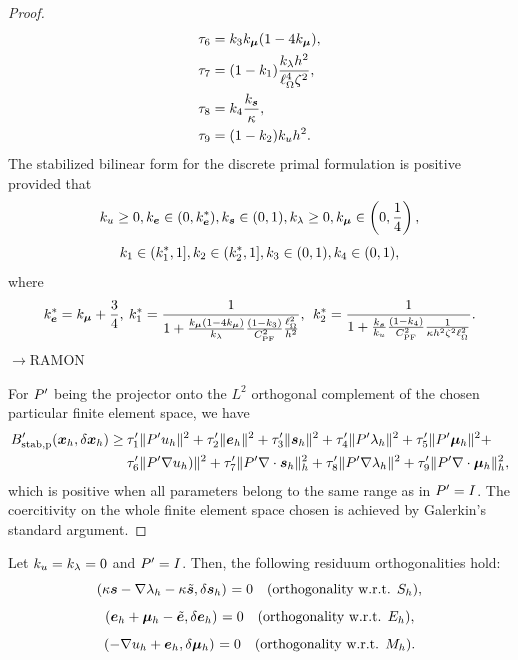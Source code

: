 \begin{proof}
\begin{align*}
    \ttdu &= \kPu\km(1-4\km),\\
    \ttds &= (1-\kYus)\frac{\kl h^2}{\length^4\zeta^2},\\
    \ttdl &= \kPl\frac{\ks}{\kappa},\\
    \ttdm &= (1-\kYlm)\ku h^2.\\
\end{align*}
The stabilized bilinear form for the discrete primal formulation is positive provided that
$$
\ku \geq 0, \ke\in(0,\ke^*),\ks\in(0, 1),\kl\geq 0,\km\in\left(0,\frac14\right),
$$
$$
\kYus\in(\kYus^*,1],\kYlm\in(\kYlm^*,1],\kPu\in(0,1),\kPl\in(0,1),
$$
where
$$
\ke^* = \km+\frac34,
\:
\kYus^* = \frac{1}{1+\frac{\km(1-4\km)}{\kl}\frac{(1-\kPu)}{\CPF^2}\frac{\length^2}{h^2}},
\:\:
\kYlm^* = \frac{1}{1+\frac{\ks}{\ku}\frac{(1-\kPl)}{\CPF^2}\frac{1}{\kappa h^2\zeta^2\length^2}}.
$$
\noindent$\rightarrow$RAMON

For $\Pt$ being the projector onto the $L^2$ orthogonal complement of the chosen particular finite element space, we have
\begin{align*}
\Bsp'(\xFh,\delta\xFh) \geq 
&\: \ttu'\norm[]{\Pt\uFh}^2+
    \tte'\norm[]{\eFh}^2+
    \tts'\norm[]{\sFh}^2+
    \ttl'\norm[]{\Pt\lFh}^2+
    \ttm'\norm[]{\Pt\mFh}^2+
    \\    
&\: \ttdu'\norm[]{\Pt\nabla\uFh)}^2+
    \ttds'\norm[h]{\Pt\nabla\cdot\sFh}^2+ 
    \ttdl'\norm[]{\Pt\nabla\lFh}^2+
    \ttdm'\norm[h]{\Pt\nabla\cdot\mFh}^2,
\end{align*}
which is positive when all parameters belong to the same range as in $\Pt = I$. The coercitivity on the whole finite element space chosen is achieved by Galerkin's standard argument.



\end{proof}

\begin{proposition}
Let $\ku = \kl = 0$ and $\Pt = I$. Then, the following residuum orthogonalities hold:
$$\iprod[]{\kappa\sF-\nabla\lFh-\kappa\sFt}{\delta\sFh} = 0\quad(\text{orthogonality w.r.t. } S_h),$$
$$\iprod[]{\eFh+\mFh-\eFt                 }{\delta\eFh} = 0\quad(\text{orthogonality w.r.t. } E_h),$$
$$\iprod[]{-\nabla\uFh+\eFh               }{\delta\mFh} = 0\quad(\text{orthogonality w.r.t. } M_h).$$
\end{proposition}

